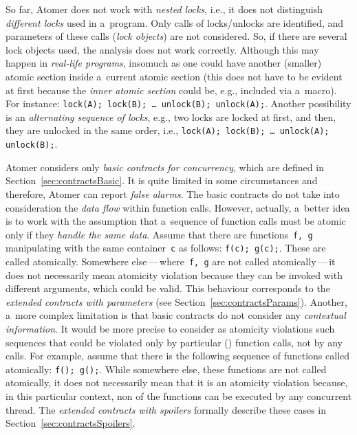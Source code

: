 So far, Atomer does not work with \emph{nested locks}, i.e., it does not
distinguish \emph{different locks} used in a~program. Only calls of
locks/unlocks are identified, and parameters of these calls (\emph{lock
objects}) are not considered. So, if there are several lock objects used, the
analysis does not work correctly. Although this may happen in \emph{real-life
programs}, insomuch as one could have another (smaller) atomic section inside
a~current atomic section (this does not have to be evident at first because
the \emph{inner atomic section} could be, e.g., included via a~macro). For
instance: \texttt{lock(A); lock(B); \ldots\ unlock(B); unlock(A);}. Another
possibility is an \emph{alternating sequence of locks}, e.g., two locks are
locked at first, and then, they are unlocked in the same order, i.e.,
\texttt{lock(A); lock(B); \ldots\ unlock(A); unlock(B);}.

Atomer considers only \emph{basic contracts for concurrency}, which are defined
in Section~\ref{sec:contractsBasic}. It is quite limited in some circumstances
and therefore, Atomer can report \emph{false alarms}. The basic contracts do
not take into consideration the \emph{data flow} within function calls.
However, actually, a~better idea is to work with the assumption that a~sequence
of function calls must be atomic only if they \emph{handle the same data}.
Assume that there are functions~\texttt{f, g} manipulating with the same
container~\texttt{c} as follows: \texttt{f(c); g(c);}. These are called
atomically. Somewhere else\,---\,where~\texttt{f, g} are not called
atomically\,---\,it does not necessarily mean atomicity violation because they
can be invoked with different arguments, which could be valid. This behaviour
corresponds to the \emph{extended contracts with parameters} (see
Section~\ref{sec:contractsParams}). Another, a~more complex limitation is that
basic contracts do not consider any \emph{contextual information}. It would be
more precise to consider as atomicity violations such sequences that could be
violated only by particular () function calls, not by any calls.
For example, assume that there is the following sequence of functions called
atomically: \texttt{f(); g();}. While somewhere else, these functions are not
called atomically, it does not necessarily mean that it is an atomicity
violation because, in this particular context, non of the 
functions can be executed by any concurrent thread. The \emph{extended
contracts with spoilers} formally describe these cases in
Section~\ref{sec:contractsSpoilers}.

